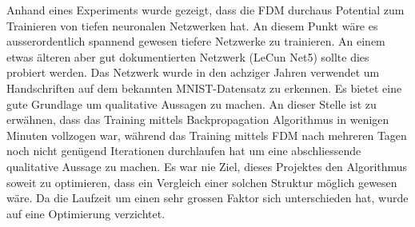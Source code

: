 Anhand eines Experiments wurde gezeigt, dass die FDM durchaus Potential zum Trainieren von tiefen neuronalen Netzwerken hat. An diesem Punkt wäre es ausserordentlich spannend gewesen tiefere Netzwerke zu trainieren. An einem etwas älteren aber gut dokumentierten Netzwerk (LeCun Net5) sollte dies probiert werden. Das Netzwerk wurde in den achziger Jahren verwendet um Handschriften auf dem bekannten MNIST-Datensatz zu erkennen. Es bietet eine gute Grundlage um qualitative Aussagen zu machen. An dieser Stelle ist zu erwähnen, dass das Training mittels Backpropagation Algorithmus in wenigen Minuten vollzogen war, während das Training mittels FDM nach mehreren Tagen noch nicht genügend Iterationen durchlaufen hat um eine abschliessende qualitative Aussage zu machen. Es war nie Ziel, dieses Projektes den Algorithmus soweit zu optimieren, dass ein Vergleich einer solchen Struktur möglich gewesen wäre. Da die Laufzeit um einen sehr grossen Faktor sich unterschieden hat, wurde auf eine Optimierung verzichtet. 